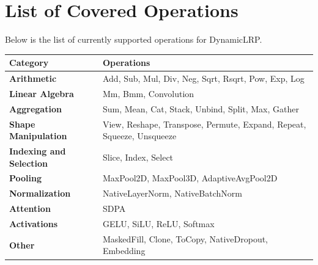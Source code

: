 \documentclass{article}
\begin{document}
\newpage

\appendix
\section{List of Covered Operations}
\label{appendix:covered-operations}
Below is the list of currently supported operations for DynamicLRP.
\begin{table}[!h]
\begin{center}
  \begin{tabular}{ll}
    \toprule
    \textbf{Category} & \textbf{Operations} \\
    \midrule
    \textbf{Arithmetic} & Add, Sub, Mul, Div, Neg, Sqrt, Rsqrt, Pow, Exp, Log \\
    \textbf{Linear Algebra} & Mm, Bmm, Convolution \\
    \textbf{Aggregation} & Sum, Mean, Cat, Stack, Unbind, Split, Max, Gather \\
    \textbf{Shape Manipulation} & View, Reshape, Transpose, Permute, Expand, Repeat, Squeeze, Unsqueeze \\
    \textbf{Indexing and Selection} & Slice, Index, Select \\
    \textbf{Pooling} & MaxPool2D, MaxPool3D, AdaptiveAvgPool2D \\
    \textbf{Normalization} & NativeLayerNorm, NativeBatchNorm \\
    \textbf{Attention} & SDPA \\
    \textbf{Activations} & GELU, SiLU, ReLU, Softmax \\
    \textbf{Other} & MaskedFill, Clone, ToCopy, NativeDropout, Embedding \\
    \bottomrule
  \end{tabular}
\end{center}
\end{table}
\end{document}
